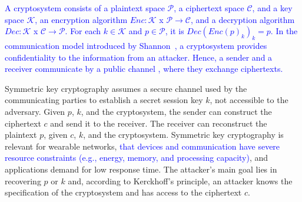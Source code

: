 \documentclass[journal]{IEEEtran}
\newcommand{\rever}{\textcolor{blue}}
\newcommand{\refazer}[1]{{\color{red}{[#1]}}}
\begin{document}
\rever{A cryptosystem consists of a plaintext space $\mathcal{P}$, a ciphertext space $\mathcal{C}$, and a key space $\mathcal{K}$, an encryption algorithm $Enc: \mathcal{K}$ x $\mathcal{P} \rightarrow \mathcal{C}$, and a decryption algorithm $Dec: \mathcal{K}$ x $\mathcal{C} \rightarrow \mathcal{P}$. For each $k \in \mathcal{K}$ and $p \in \mathcal{P}$, it is $Dec(Enc(p)_k)_k = p$. In the communication model introduced by Shannon~\cite{shannon}, a cryptosystem provides confidentiality to the information from an attacker. %
Hence, a sender and a receiver communicate by a public channel%
, where they exchange ciphertexts. }

Symmetric key cryptography assumes a secure channel used by the communicating parties to establish a secret session key $k$, not accessible to the adversary. Given $p$, $k$, and the cryptosystem, the sender can construct the ciphertext $c$ and send it to the receiver. %
The receiver can reconstruct the plaintext $p$, given $c$, $k$, and the cryptosystem. Symmetric key cryptography is relevant for wearable networks, \rever{that devices and communication have severe resource constraints (e.g., energy, memory, and processing capacity)}, and applications demand for low response time. %
The attacker's main goal lies in recovering $p$ or $k$ and, according to Kerckhoff’s principle, an attacker knows the specification of the cryptosystem and has access to the ciphertext $c$. 

\end{document}
